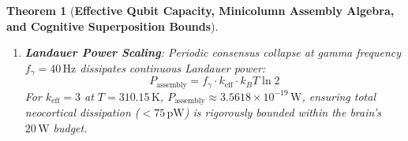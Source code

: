 \documentclass[10pt,twocolumn,3p]{article}
\newtheorem{theorem}{Theorem}
\begin{document}
\begin{theorem}[\textbf{Effective Qubit Capacity, Minicolumn Assembly Algebra, and Cognitive Superposition Bounds}]
\begin{enumerate}
    \begin{equation}
        \tau_{\text{crit}}(k) \ge \tau_\gamma \iff k \le 4
    \end{equation}
    For $k \ge 5$, $\tau_{\text{crit}}(k) < 25.0\,\text{ms}$, inducing Entanglement Sudden Death before consensus readout.
    \item \textbf{Landauer Power Scaling}: Periodic consensus collapse at gamma frequency $f_\gamma = 40\,\text{Hz}$ dissipates continuous Landauer power:
    \begin{equation}
        P_{\text{assembly}} = f_\gamma \cdot k_{\text{eff}} \cdot k_B T \ln 2
    \end{equation}
    For $k_{\text{eff}} = 3$ at $T = 310.15\,\text{K}$, $P_{\text{assembly}} \approx 3.5618 \times 10^{-19}\,\text{W}$, ensuring total neocortical dissipation ($< 75\,\text{pW}$) is rigorously bounded within the brain's $20\,\text{W}$ budget.
\end{enumerate}
\end{theorem}
\end{document}
